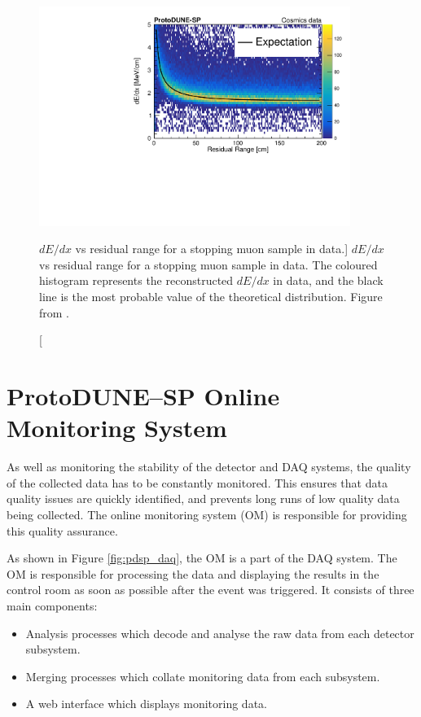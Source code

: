 \begin{figure}

	\centering

	\includegraphics[width=0.9\textwidth]{figures/dedx_v_rr.pdf}

	\caption
	[$dE/dx$ vs residual range for a stopping muon sample in \protodune{} data.]
	{$dE/dx$ vs residual range for a stopping muon sample in \protodune{} data.
	The coloured histogram represents the reconstructed $dE/dx$ in \protodune{}
	data, and the black line is the most probable value of the theoretical 
	distribution. Figure from \cite{protoduneperf}.}

	\label{fig:dedx_v_rr}

\end{figure}

\section{ProtoDUNE--SP Online Monitoring System} \label{sec:pdsp_om}

As well as monitoring the stability of the detector and DAQ systems, the quality
of the collected data has to be constantly monitored. This ensures that data
quality issues are quickly identified, and prevents long runs of low quality
data being collected. The online monitoring system (OM) is responsible for 
providing this quality assurance.

As shown in Figure \ref{fig:pdsp_daq}, the OM is a part of the \protodune{} DAQ
system. The OM is responsible for processing the data and displaying
the results in the control room as soon as possible after the event was 
triggered. It consists of three main components:
\begin{itemize}
	\item Analysis processes which decode and analyse the raw data from each 
		detector subsystem.
	\item Merging processes which collate monitoring data from each subsystem.
	\item A web interface which displays monitoring data.
\end{itemize}


